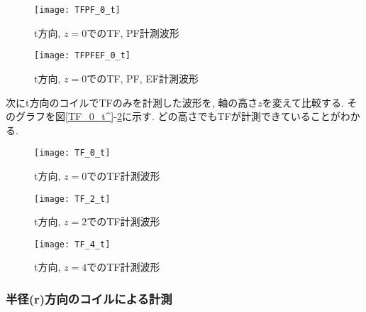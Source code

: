 \documentclass[]{jsarticle}
\begin{document}
		\begin{figure}[htbp]
		\begin{minipage}{0.5\hsize}
			\begin{center}
				\texttt{[image: TFPF\_0\_t]}
				\caption{t方向, $z = 0$でのTF, PF計測波形}
				\label{TFPF_0_t}
			\end{center}
		\end{minipage}
		\begin{minipage}{0.5\hsize}
			\begin{center}
				\texttt{[image: TFPFEF\_0\_t]}
				\caption{t方向, $z = 0$でのTF, PF, EF計測波形}
				\label{TFPFEF_0_t}
			\end{center}
		\end{minipage}
	\end{figure}

次にt方向のコイルでTFのみを計測した波形を, 軸の高さ$z$を変えて比較する. そのグラフを図\ref{TF_0_t^}-\ref{TF_4_t}に示す. どの高さでもTFが計測できていることがわかる. 

	\begin{figure}[htbp]
	
		\begin{minipage}{0.33\hsize}
			\begin{center}
				\texttt{[image: TF\_0\_t]}
				\caption{t方向, $z = 0$でのTF計測波形}
				\label{TF_0_t^}
			\end{center}
		\end{minipage}
		\begin{minipage}{0.33\hsize}
			\begin{center}
				\texttt{[image: TF\_2\_t]}
				\caption{t方向, $z = 2$でのTF計測波形}
				\label{TF_2_t}
			\end{center}
		\end{minipage}
		\begin{minipage}{0.33\hsize}
			\begin{center}
				\texttt{[image: TF\_4\_t]}
				\caption{t方向, $z = 4$でのTF計測波形}
				\label{TF_4_t}
			\end{center}
		\end{minipage}
		
	\end{figure}
		
		\subsubsection{半径(r)方向のコイルによる計測}
		
\end{document}
